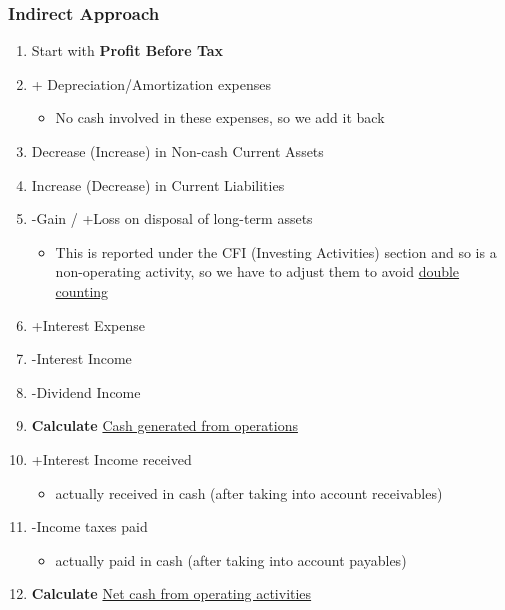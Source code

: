 \documentclass{article}
\begin{document}
\begin{multicols}{2}
\subsubsection{Indirect Approach}
\begin{enumerate}
	\item Start with \textbf{Profit Before Tax}
	\item + Depreciation/Amortization expenses
	\begin{itemize}
		\item No cash involved in these expenses, so we add it back
	\end{itemize}
    \item Decrease (Increase) in Non-cash Current Assets
    \item Increase (Decrease) in Current Liabilities
    \item -Gain / +Loss on disposal of long-term assets
    \begin{itemize}
    	\item This is reported under the CFI (Investing Activities) section and so is a non-operating activity, so we have to adjust them to avoid \underline{double counting}
    \end{itemize}
    \item +Interest Expense
	\item -Interest Income
	\item -Dividend Income
    \item \textbf{Calculate} \underline{Cash generated from operations}
    \item +Interest Income received
    \begin{itemize}
    	\item actually received in cash (after taking into account receivables)
    \end{itemize}
    \item -Income taxes paid
    \begin{itemize}
    	\item actually paid in cash (after taking into account payables)
    \end{itemize}
    \item \textbf{Calculate} \underline{Net cash from operating activities}
\end{enumerate}


\end{multicols}
\end{document}
